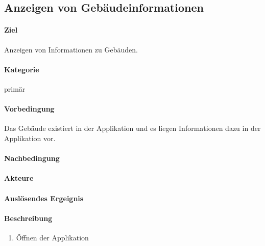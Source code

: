 \subsection{Anzeigen von Gebäudeinformationen}
\label{Anzeigen von Gebäudeinformationen}
\paragraph{Ziel}
Anzeigen von Informationen zu Gebäuden.
\paragraph{Kategorie}
primär
\paragraph{Vorbedingung}
Das Gebäude existiert in der Applikation und es liegen Informationen dazu in der Applikation vor.
\paragraph{Nachbedingung}

\paragraph{Akteure}

\paragraph{Auslösendes Ergeignis}

\paragraph{Beschreibung}
\begin{enumerate}
    \item Öffnen der Applikation
\end{enumerate}